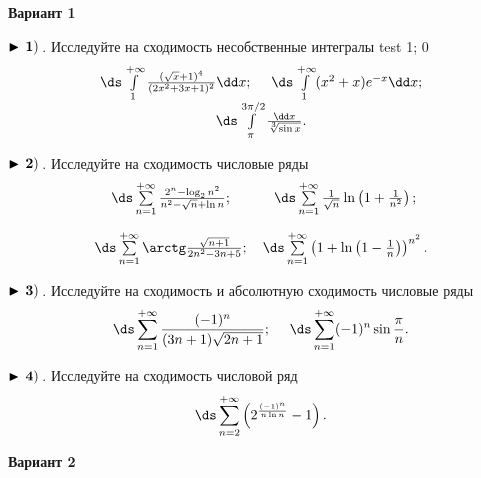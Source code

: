 
\centerline{\bf\Large Вариант 1}


$\bf\blacktriangleright\,1)\,$. Исследуйте на сходимость несобственные интегралы test 1; 0
\begin{equation*}
\begin{array}{cc}
  \,
\ds\int\limits_{1}^{+\infty} \frac{(\sqrt{x}+1)^4}{(2x^2+3x+1)^2}\dd x

  ;\quad\,    \,
\ds\int\limits_{1}^{+\infty} (x^2+x)e^{-x}\dd x

  ;\\
  \,
\ds\int\limits_{\pi}^{3\pi/2}\frac{\dd x}{\sqrt[3]{\sin x}}

  .
\end{array}
\end{equation*}


$\bf\blacktriangleright\,2)\,$. Исследуйте на сходимость числовые ряды
\begin{equation*}
    \begin{array}{ccc}
        \,\ds\sum\limits_{n=1}^{+\infty}\frac{2^n-\log_2 n^2}{n^2-\sqrt{n}+\ln n}

        ; &   \,
\ds\sum\limits_{n=1}^{+\infty}\frac{1}{\sqrt{n}}\ln\left(1+\frac{1}{n^2}\right)

        ; \\[6mm]
        \,
\ds\sum\limits_{n=1}^{+\infty}\arctg\frac{\sqrt{n+1}}{2n^2-3n+5}

        ; &    \,
\ds\sum\limits_{n=1}^{+\infty}\left(1+\ln\left(1-\frac{1}{n}\right)\right)^{n^2}

        .
    \end{array}
\end{equation*}


$\bf\blacktriangleright\,3)\,$. Исследуйте на сходимость и абсолютную сходимость числовые ряды
\begin{equation*}
    \,
\ds\sum\limits_{n=1}^{+\infty}\frac{(-1)^n}{(3n+1)\sqrt{2n+1}}

    ;\quad\,   \,
\ds\sum\limits_{n=1}^{+\infty}(-1)^n\sin\frac{\pi}{n}

    .
\end{equation*}


$\bf\blacktriangleright\,4)\,$. Исследуйте на сходимость числовой ряд
\begin{equation*}
    \,\ds\sum\limits_{n=2}^{+\infty}\left(2^{\frac{(-1)^n}{n\ln n}}-1\right)

    .
\end{equation*}

\centerline{\bf\Large Вариант 2}


